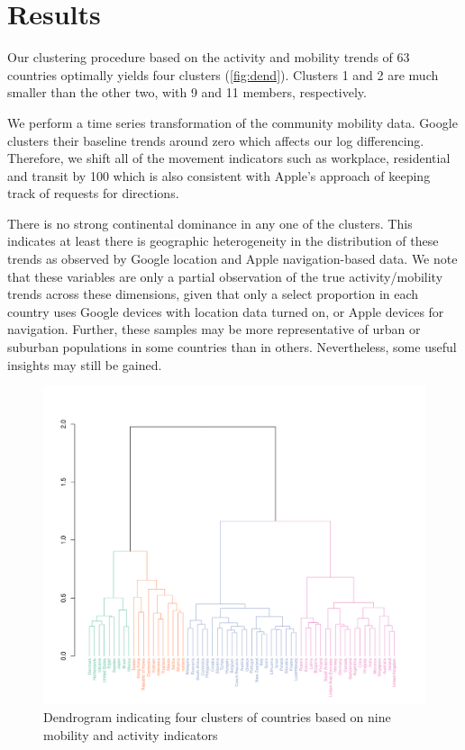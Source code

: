\documentclass[preprint, 12pt]{elsarticle}
\newcommand{\?}{\stackrel{?}{=}}
\begin{document}
\section{Results }
Our clustering procedure based on the activity and mobility trends of 63 countries optimally yields four clusters (\autoref{fig:dend}).
Clusters 1 and 2 are much smaller than the other two, with 9 and 11 members, respectively.

We perform a time series transformation of the community mobility data. Google clusters their baseline trends around zero which affects our log differencing.
Therefore, we shift all of the movement indicators such as workplace, residential and transit by 100 which is also consistent with Apple's approach of keeping track of requests for directions.

There is no strong continental dominance in any one of the clusters.
This indicates at least there is geographic heterogeneity in the distribution of these trends as observed by Google location and Apple navigation-based data.
We note that these variables are only a partial observation of the true activity/mobility trends across these dimensions, given that only a select proportion in each country uses Google devices with location data turned on, or Apple devices for navigation.
Further, these samples may be more representative of urban or suburban populations in some countries than in others.
Nevertheless, some useful insights may still be gained.

\begin{figure}[h!]
  \includegraphics[width=\textwidth,trim={0cm 0 1.9cm 7cm},clip]{dendrogram}
  \caption{Dendrogram indicating four clusters of countries based on nine mobility and activity indicators}
  \label{fig:dend}
\end{figure}
\end{document}
